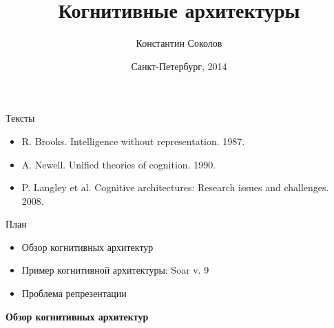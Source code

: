 \documentclass{beamer}
\begin{document}
\title{\Large{Когнитивные архитектуры}}
\author{Константин Соколов}
\date{Санкт-Петербург, 2014} 
\begin{frame}
    \thispagestyle{empty}
    \titlepage
\end{frame}

\begin{frame}{Тексты}
\setcounter{framenumber}{1}
\begin{itemize}
	\item R. Brooks. Intelligence without representation. 1987.
    \medskip
    \item A. Newell. Unified theories of cognition. 1990.
    \medskip
    \item P. Langley et al. Cognitive architectures: Research issues and challenges. 2008.
\end{itemize}
\end{frame}

\begin{frame}{План}
    \begin{itemize}
        \item Обзор когнитивных архитектур
        \medskip
        \item Пример когнитивной архитектуры: Soar v. 9
        \medskip
        \item Проблема репрезентации
        \medskip
    \end{itemize}
\end{frame}

\begin{frame}{}
\begin{center}
	\textbf{Обзор когнитивных архитектур}
\end{center}
\end{frame}

%
\end{document}
